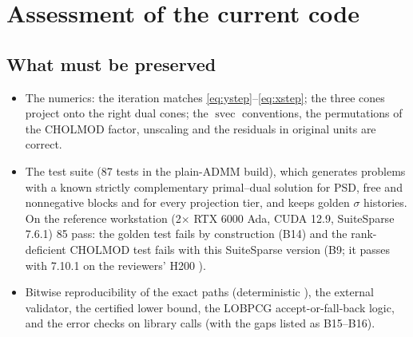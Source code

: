 \documentclass[11pt]{article}
\newcommand{\svec}{\operatorname{svec}}
\begin{document}
\section{Assessment of the current code}\label{sec:assessment}

\subsection{What must be preserved}
\begin{itemize}
  \item The numerics: the iteration matches \eqref{eq:ystep}--\eqref{eq:xstep}; the three cones project
  onto the right dual cones; the $\svec$ conventions, the permutations of the CHOLMOD factor, unscaling and
  the residuals in original units are correct.
  \item The test suite (87 tests in the plain-ADMM build), which generates problems with a known strictly
  complementary primal--dual solution for PSD, free and nonnegative blocks and for every projection tier,
  and keeps golden $\sigma$ histories. On the reference workstation (2$\times$ RTX 6000 Ada, CUDA 12.9,
  SuiteSparse 7.6.1) 85 pass: the golden test fails by construction (B14) and the rank-deficient CHOLMOD test
  fails with this SuiteSparse version (B9; it passes with 7.10.1 on the reviewers' H200 \cite{review20}).
  \item Bitwise reproducibility of the exact paths (deterministic ), the
  external validator, the certified lower bound, the LOBPCG accept-or-fall-back logic, and the error checks
  on library calls (with the gaps listed as B15--B16).
\end{itemize}
\end{document}
